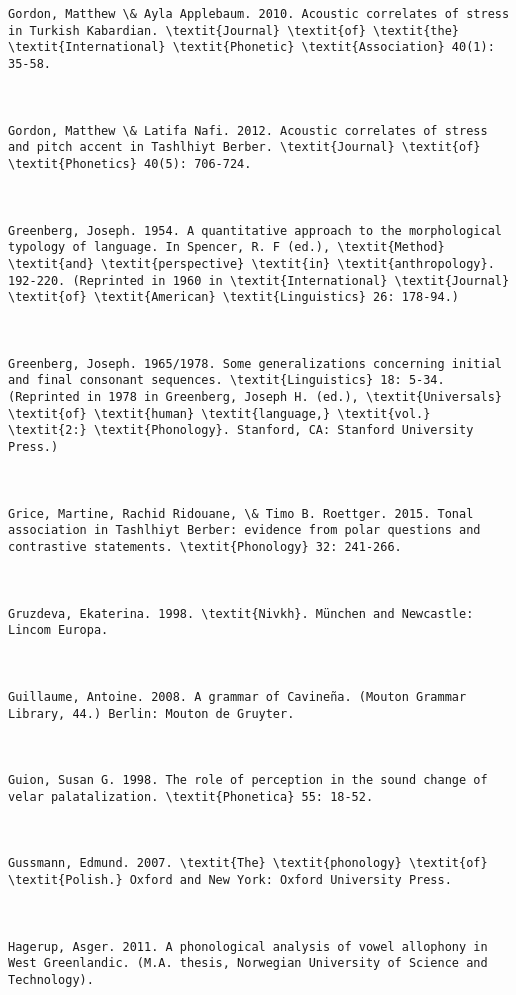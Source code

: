 \begin{verbatim}
Gordon, Matthew \& Ayla Applebaum. 2010. Acoustic correlates of stress in Turkish Kabardian. \textit{Journal} \textit{of} \textit{the} \textit{International} \textit{Phonetic} \textit{Association} 40(1): 35-58.



Gordon, Matthew \& Latifa Nafi. 2012. Acoustic correlates of stress and pitch accent in Tashlhiyt Berber. \textit{Journal} \textit{of} \textit{Phonetics} 40(5): 706-724.



Greenberg, Joseph. 1954. A quantitative approach to the morphological typology of language. In Spencer, R. F (ed.), \textit{Method} \textit{and} \textit{perspective} \textit{in} \textit{anthropology}. 192-220. (Reprinted in 1960 in \textit{International} \textit{Journal} \textit{of} \textit{American} \textit{Linguistics} 26: 178-94.)



Greenberg, Joseph. 1965/1978. Some generalizations concerning initial and final consonant sequences. \textit{Linguistics} 18: 5-34. (Reprinted in 1978 in Greenberg, Joseph H. (ed.), \textit{Universals} \textit{of} \textit{human} \textit{language,} \textit{vol.} \textit{2:} \textit{Phonology}. Stanford, CA: Stanford University Press.) 



Grice, Martine, Rachid Ridouane, \& Timo B. Roettger. 2015. Tonal association in Tashlhiyt Berber: evidence from polar questions and contrastive statements. \textit{Phonology} 32: 241-266.



Gruzdeva, Ekaterina. 1998. \textit{Nivkh}. München and Newcastle: Lincom Europa.



Guillaume, Antoine. 2008. A grammar of Cavineña. (Mouton Grammar Library, 44.) Berlin: Mouton de Gruyter.



Guion, Susan G. 1998. The role of perception in the sound change of velar palatalization. \textit{Phonetica} 55: 18-52.



Gussmann, Edmund. 2007. \textit{The} \textit{phonology} \textit{of} \textit{Polish.} Oxford and New York: Oxford University Press.



Hagerup, Asger. 2011. A phonological analysis of vowel allophony in West Greenlandic. (M.A. thesis, Norwegian University of Science and Technology).




\end{verbatim}
